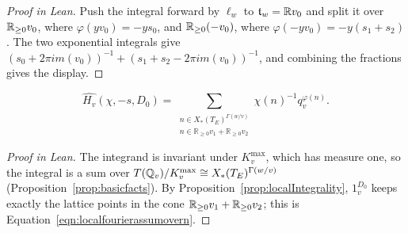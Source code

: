 \begin{proof}[Proof in Lean]

\leanok


Push the integral forward by $\ell_w$ to $\mathfrak t_w=\mathbb{R} v_0$ and split it over $\mathbb{R}_{\geq0}v_0$, where $\varphi(yv_0)=-ys_0$, and $\mathbb{R}_{\geq0}(-v_0)$, where $\varphi(-yv_0)=-y(s_1+s_2)$. The two exponential integrals give $(s_0+2\pi im(v_0))^{-1}+(s_1+s_2-2\pi im(v_0))^{-1}$, and combining the fractions gives the display.

\end{proof}

\begin{equationnode}

\label{eqn:finiteHeightFourierTransform}


\leanok



\begin{equation*} \widehat{H_v}(\chi,-s,D_0) = \sum_{\substack{n \in X_\ast(T_{E})^{\Gamma(w/v)}\\ n \in \mathbb R_{\geq 0}v_1+\mathbb R_{\geq 0}v_2} } \chi(n)^{-1} q_v^{\varphi(n)} . \end{equation*}

\end{equationnode}

\begin{proof}[Proof in Lean]

\leanok


The integrand is invariant under $K_v^{\mathrm{max}}$, which has measure one, so the integral is a sum over $T(\mathbb{Q}_v)/K_v^{\mathrm{max}}\cong X_\ast(T_E)^{\Gamma(w/v)}$ (Proposition~\ref{prop:basicfacts}). By Proposition~\ref{prop:localIntegrality}, $1_v^{D_0}$ keeps exactly the lattice points in the cone $\mathbb{R}_{\geq0}v_1+\mathbb{R}_{\geq0}v_2$; this is Equation~\ref{eqn:localfourierassumovern}.

\end{proof}

